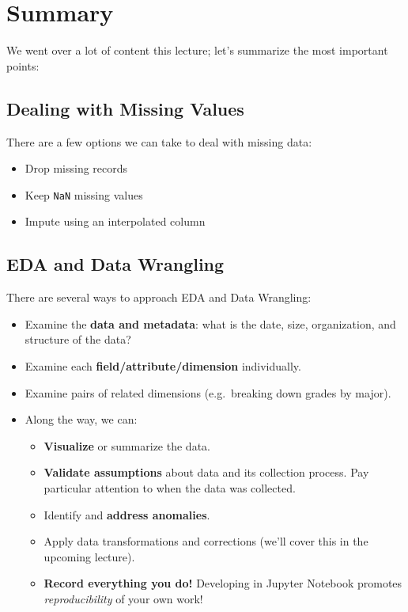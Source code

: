 \documentclass[
  letterpaper,
  DIV=11,
  numbers=noendperiod]{scrreprt}
\providecommand{\tightlist}{%
  \setlength{\itemsep}{0pt}\setlength{\parskip}{0pt}}\usepackage{longtable,booktabs,array}
\begin{document}
\section{Summary}\label{summary}

We went over a lot of content this lecture; let's summarize the most
important points:

\subsection{Dealing with Missing
Values}\label{dealing-with-missing-values}

There are a few options we can take to deal with missing data:

\begin{itemize}
\tightlist
\item
  Drop missing records
\item
  Keep \texttt{NaN} missing values
\item
  Impute using an interpolated column
\end{itemize}

\subsection{EDA and Data Wrangling}\label{eda-and-data-wrangling}

There are several ways to approach EDA and Data Wrangling:

\begin{itemize}
\tightlist
\item
  Examine the \textbf{data and metadata}: what is the date, size,
  organization, and structure of the data?
\item
  Examine each \textbf{field/attribute/dimension} individually.
\item
  Examine pairs of related dimensions (e.g.~breaking down grades by
  major).
\item
  Along the way, we can:

  \begin{itemize}
  \tightlist
  \item
    \textbf{Visualize} or summarize the data.
  \item
    \textbf{Validate assumptions} about data and its collection process.
    Pay particular attention to when the data was collected.
  \item
    Identify and \textbf{address anomalies}.
  \item
    Apply data transformations and corrections (we'll cover this in the
    upcoming lecture).
  \item
    \textbf{Record everything you do!} Developing in Jupyter Notebook
    promotes \emph{reproducibility} of your own work!
  \end{itemize}
\end{itemize}
\end{document}
